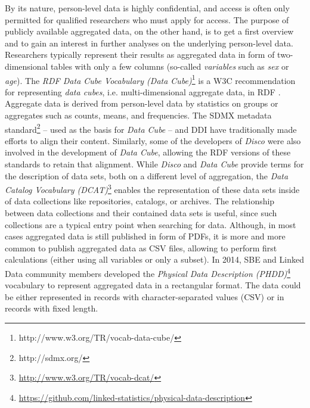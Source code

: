 \documentclass{llncs}
\begin{document}
By its nature, person-level data is highly confidential, and access is often only permitted for qualified researchers who must apply for access. 
The purpose of publicly available aggregated data, on the other hand, is to get a first overview and to gain an interest in further analyses on the underlying person-level data.
Researchers typically represent their results as aggregated data in form of two-dimensional tables with only a few columns (so-called \emph{variables} such as \emph{sex} or \emph{age}).
The \emph{RDF Data Cube Vocabulary (Data Cube)}\footnote{http://www.w3.org/TR/vocab-data-cube/} is a W3C recommendation for representing \emph{data cubes}, i.e. multi-dimensional aggregate data, in RDF \cite{Cyganiak2010}. 
Aggregate data is derived from person-level data by statistics on groups or aggregates such as counts, means, and frequencies.
The SDMX metadata standard\footnote{http://sdmx.org/} – used as the basis for \emph{Data Cube} – and DDI have traditionally made efforts to align their content. 
Similarly, some of the developers of \emph{Disco} were also involved in the development of \emph{Data Cube}, 
allowing the RDF versions of these standards to retain that alignment.
While \emph{Disco} and \emph{Data Cube} provide terms for the description of data sets, 
both on a different level of aggregation, 
the \emph{Data Catalog Vocabulary (DCAT)}\footnote{\url{http://www.w3.org/TR/vocab-dcat/}} enables the representation of these data sets inside of data collections like repositories, catalogs, or archives. 
The relationship between data collections and their contained data sets is useful, since such collections are a typical entry point when searching for data.
Although, in most cases aggregated data is still published in form of PDFs, 
it is more and more common to publish aggregated data as CSV files,
allowing to perform first calculations (either using all variables or only a subset).
In 2014, SBE and Linked Data community members developed the \emph{Physical Data Description (PHDD)}\footnote{\url{https://github.com/linked-statistics/physical-data-description}} vocabulary to represent aggregated data in a rectangular format. 
The data could be either represented in records with character-separated values (CSV) or in records with fixed length. 
\end{document}
